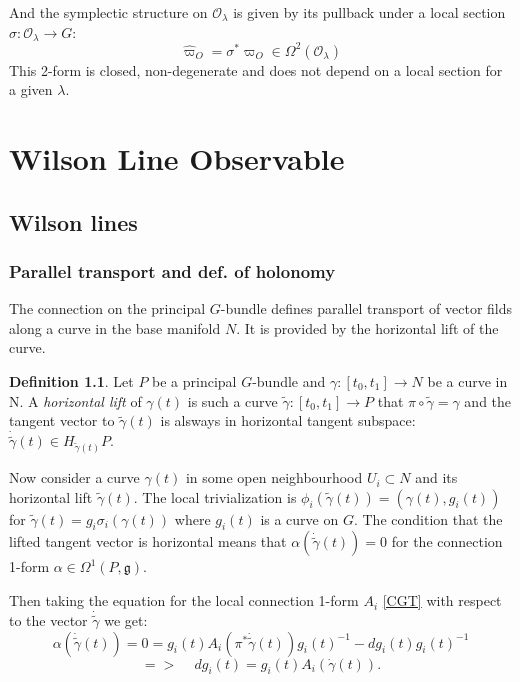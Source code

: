 \documentclass[11pt]{report}
\theoremstyle{plain}
\theoremstyle{definition}
\newtheorem{defn}[thm]{Definition}
\theoremstyle{remark}
\theoremstyle{remark}
\numberwithin{equation}{section}
\begin{document}
And the symplectic structure on $\mathcal{O}_\lambda$ is given by its pullback under a local section $\sigma: \mathcal{O}_\lambda \to G$:
\begin{equation}
\hat{\varpi}_O = \sigma^* \varpi_O \in \Omega^2(\mathcal{O}_\lambda)
\end{equation}
This 2-form is closed, non-degenerate and does not depend on a local section for a given $\lambda$. 


\chapter{Wilson Line Observable}

\section{Wilson lines}

\subsection{Parallel transport and def. of holonomy}

The connection on the principal $G$-bundle defines parallel transport of vector filds along a curve in the base manifold $N$. It is provided by the horizontal lift of the curve. 
\begin{defn}
Let $P$ be a principal $G$-bundle and $\gamma : [t_0,t_1] \to N$ be a curve in N. A \textit{horizontal lift} of $\gamma(t)$ is such a curve $\tilde{\gamma}: [t_0,t_1] \to P$ that $\pi \circ \tilde{\gamma} = \gamma$ and the tangent vector to $\tilde{\gamma}(t)$ is alsways in horizontal tangent subspace: $\dot{\tilde{\gamma}}(t) \in H_{\tilde{\gamma}(t)}P$.
\end{defn}


Now consider a curve $\gamma(t)$ in some open neighbourhood $U_i \subset N$ and its horizontal lift $\tilde{\gamma}(t)$. The local trivialization is $\phi_i(\tilde{\gamma}(t)) = (\gamma(t), g_i(t))$ for $\tilde{\gamma}(t) = g_i\sigma_i(\gamma(t))$ where $g_i(t)$ is a curve on $G$. The condition that the lifted tangent vector is horizontal means that $\alpha (\dot{\tilde{\gamma}}(t)) = 0$ for the connection 1-form $\alpha\in\Omega^1(P, \mathfrak{g})$. 

Then taking the equation for the local connection 1-form $A_i$ \eqref{CGT} with respect to the vector $\dot{\tilde{\gamma}}$ we get:
$$\alpha (\dot{\tilde{\gamma}}(t)) = 0 = g_i(t) A_i(\pi^*\dot{\tilde{\gamma}}(t))g_i(t)^{-1} - dg_i(t)g_i(t)^{-1}$$
\begin{equation}\label{PTE}
  =>  \, \, \,\, \,\, \, dg_i(t) = g_i(t) A_i(\dot{\gamma}(t)).
\end{equation}
\end{document}
